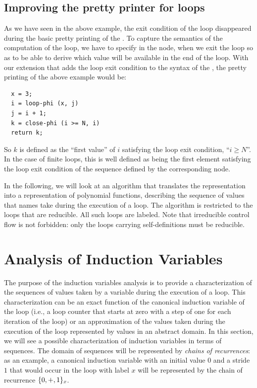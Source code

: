 \subsection{Improving the \SSA{} pretty printer for loops}

As we have seen in the above example, the exit condition of the loop
disappeared during the basic pretty printing of the \SSA{}.  To capture
the semantics of the computation of the loop, we have to specify in
the \closephi{} node, when we exit the loop so as to be able to derive which value will be available in the end of the
loop. With our
extension that adds the loop exit condition to the syntax of the \closephi{}, the \SSA{} pretty printing of the above example would be:
\begin{verbatim}
  x = 3;
  i = loop-phi (x, j)
  j = i + 1;
  k = close-phi (i >= N, i)
  return k;
\end{verbatim}
So $k$ is defined as the ``first value'' of $i$ satisfying the loop
exit condition, ``$i \geq N$''.  In the case of finite loops, this is well defined as being the first element satisfying the loop exit condition of the sequence defined by the corresponding \loopphi{} node.

In the following, we will look at an algorithm that translates the
\SSA{} representation into a representation of polynomial functions,
describing the sequence of values that \SSA{} names take during the
execution of a loop. The algorithm is restricted to the loops that are
reducible. All such loops are labeled. Note that irreducible control
flow is not forbidden: only the loops carrying self-definitions must
be reducible.

\section{Analysis of Induction Variables}

The purpose of the induction variables analysis is to provide a
characterization of the sequences of values taken by a variable during
the execution of a loop.  This characterization can be an exact
function of the canonical induction variable of the loop (i.e., a loop counter that starts at zero with a step of one for
each iteration of the loop) or an approximation of the values taken
during the execution of the loop represented by values in an abstract
domain.  In this section, we will see a possible characterization of
induction variables in terms of sequences.  The domain of sequences
will be represented by {\em chains of recurrences}: as an example, a
canonical induction variable with an initial value $0$ and a stride
$1$ that would occur in the loop with label $x$ will be represented by
the chain of recurrence $\{0, +, 1\}_x$.

